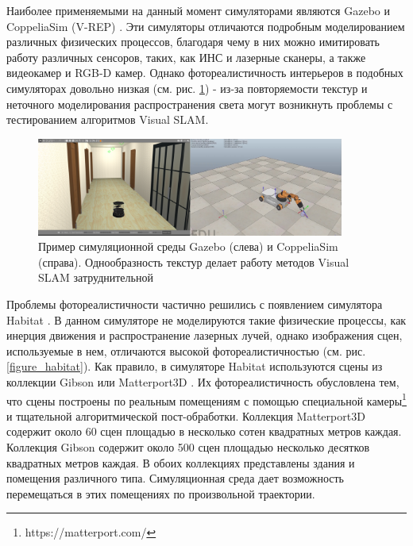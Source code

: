 \documentclass{mipt-thesis-ms}
\begin{document}
	Наиболее применяемыми на данный момент симуляторами являются Gazebo \cite{koenig2004design} и CoppeliaSim (V-REP) \cite{rooban2021coppeliasim}. Эти симуляторы отличаются подробным моделированием различных физических процессов, благодаря чему в них можно имитировать работу различных сенсоров, таких, как ИНС и лазерные сканеры, а также видеокамер и RGB-D камер. Однако фотореалистичность интерьеров в подобных симуляторах довольно низкая (см. рис. \ref{figure_gazebo_vrep}) - из-за повторяемости текстур и неточного моделирования распространения света могут возникнуть проблемы с тестированием алгоритмов Visual SLAM.
	
	\begin{figure}
		\centering
		\includegraphics[width=0.9\textwidth]{img/gazebo_vrep.png}
		\caption{Пример симуляционной среды Gazebo (слева) и CoppeliaSim (справа). Однообразность текстур делает работу методов Visual SLAM затруднительной}
		\label{figure_gazebo_vrep}
	\end{figure}
	
	Проблемы фотореалистичности частично решились с появлением симулятора Habitat \cite{savva2019habitat}. В данном симуляторе не моделируются такие физические процессы, как инерция движения и распространение лазерных лучей, однако изображения сцен, используемые в нем, отличаются высокой фотореалистичностью (см. рис. \ref{figure_habitat}). Как правило, в симуляторе Habitat используются сцены из коллекции Gibson \cite{xia2018gibson} или Matterport3D \cite{chang2017matterport3d}. Их фотореалистичность обусловлена тем, что сцены построены по реальным помещениям с помощью специальной камеры\footnote{https://matterport.com/} и тщательной алгоритмической пост-обработки. Коллекция Matterport3D содержит около 60 сцен площадью в несколько сотен квадратных метров каждая. Коллекция Gibson содержит около 500 сцен площадью несколько десятков квадратных метров каждая. В обоих коллекциях представлены здания и помещения различного типа. Симуляционная среда дает возможность перемещаться в этих помещениях по произвольной траектории.
	
\end{document}
